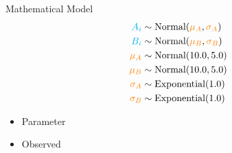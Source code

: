 \documentclass[aspectratio=169,xcolor=svgnames]{beamer}
\begin{document}
\newcommand{\normal}[1]{\text{Normal}(#1)}
\newcommand{\exponential}[1]{\text{Exponential}(#1)}

\begin{frame}{Mathematical Model}
  \begin{align*}
    \observed{A_i} &\sim \normal{\parameter{\mu_A}, \parameter{\sigma_A}}\\
    \observed{B_i} &\sim \normal{\parameter{\mu_B}, \parameter{\sigma_B}}\\
    \parameter{\mu_A} &\sim \normal{10.0, 5.0}\\
    \parameter{\mu_B} &\sim \normal{10.0, 5.0}\\
    \parameter{\sigma_A} &\sim \exponential{1.0}\\
    \parameter{\sigma_B} &\sim \exponential{1.0}\\
  \end{align*}

  \begin{itemize}
  \item {} Parameter
  \item {} Observed
  \end{itemize}
\end{frame}
\end{document}
